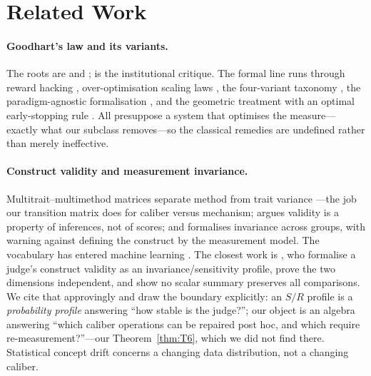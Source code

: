 \documentclass{article}
\begin{document}
\section{Related Work}
\label{sec:related}

\paragraph{Goodhart's law and its variants.} The roots are \citet{goodhart1975problems} and
\citet{strathern1997improving}; \citet{muller2018tyranny} is the institutional critique. The formal line runs
through reward hacking \citep{skalse2022rewardhacking,amodei2016concrete}, over-optimisation scaling laws
\citep{gao2023scaling}, the four-variant taxonomy \citep{manheim2018categorizing}, the paradigm-agnostic
formalisation \citep{majka2025goodhart}, and the geometric treatment with an optimal early-stopping rule
\citep{karwowski2023goodhart}. All presuppose a system that optimises the measure---exactly what our subclass
removes---so the classical remedies are undefined rather than merely ineffective.

\paragraph{Construct validity and measurement invariance.} Multitrait--multimethod matrices separate method
from trait variance \citep{campbell1959convergent}---the job our transition matrix does for caliber versus
mechanism; \citet{messick1995validity} argues validity is a property of inferences, not of scores; and
\citet{meredith1993measurement} formalises invariance across groups, with \citet{borsboom2006attack}
warning against defining the construct by the measurement model. The vocabulary has entered machine
learning \citep{bean2025constructvalidity,freiesleben2026benchmarkingepistemology}. The closest work is
\citet{chen2026judge}, who formalise a judge's construct validity as an invariance/sensitivity profile, prove
the two dimensions independent, and show no scalar summary preserves all comparisons. We cite that
approvingly and draw the boundary explicitly: an $S/R$ profile is a \emph{probability profile} answering
``how stable is the judge?''; our object is an algebra answering ``which caliber operations can be repaired
post hoc, and which require re-measurement?''---our Theorem~\ref{thm:T6}, which we did not find there.
Statistical concept drift \citep{cerqueira2026conceptdrift} concerns a changing data distribution, not a
changing caliber.
\end{document}
